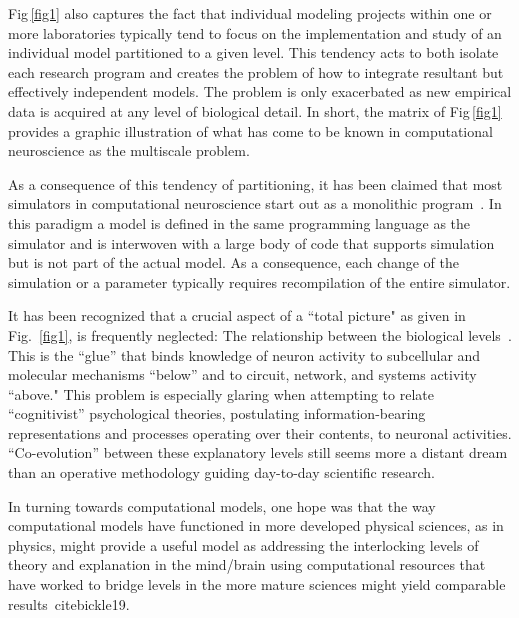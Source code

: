 \documentclass[10pt,letterpaper]{article}
\begin{document}
Fig\,\ref{fig1} also captures the fact that individual modeling projects within one or more laboratories typically tend to focus on the implementation and study of an individual model partitioned to a given level. This tendency acts to both isolate each research program and creates the problem of how to integrate resultant but effectively independent models. The problem is only exacerbated as new empirical data is acquired at any level of biological detail. In short, the matrix of Fig\,\ref{fig1} provides a graphic illustration of what has come to be known in computational neuroscience as the multiscale problem.

As a consequence of this tendency of partitioning, it has been claimed that most simulators in computational neuroscience start out as a monolithic program~\cite{cannon07:_inter}. In this paradigm a model is defined in the same programming language as the simulator and is interwoven with a large body of code that supports simulation but is not part of the actual model. As a consequence, each change of the simulation or a parameter typically requires recompilation of the entire simulator.

It has been recognized that a crucial aspect of a ``total picture" as given in Fig.~\ref{fig1}, is frequently neglected: The relationship between the biological levels~\cite{bickle19}. This is the “glue” that binds knowledge of neuron activity to subcellular and molecular mechanisms “below” and to circuit, network, and systems activity “above." This problem is especially glaring when attempting to relate “cognitivist” psychological theories, postulating information-bearing representations and processes operating over their contents, to neuronal activities. “Co-evolution” between these explanatory levels still seems more a distant dream than an operative methodology guiding day-to-day scientific research.

In turning towards computational models, one hope was that the way computational models have functioned in more developed physical sciences, as in physics, might provide a useful model as addressing the interlocking levels of theory and explanation in the mind/brain using computational resources that have worked to bridge levels in the more mature sciences might yield comparable results~cite{bickle19}.

\end{document}
